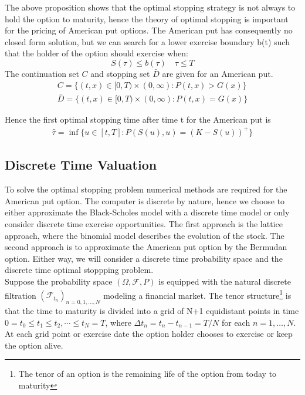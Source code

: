 The above proposition shows that the optimal stopping strategy is not always to hold the option to maturity, hence the theory of optimal stopping is important for the pricing of American put options. The American put has consequently no closed form solution, but we can search for a lower exercise boundary b(t) such that the holder of the option should exercise when:
$$S(\tau)\leq b(\tau) \quad \tau \leq T$$
The continuation set $C$ and stopping set $\bar{D}$ are given for an American put.
\begin{align*}
C=\{(t,x) \in [0,T) \times (0,\infty) : P(t,x) > G(x) \}\\
\bar{D}=\{(t,x) \in [0,T) \times (0,\infty) : P(t,x) = G(x) \}
\end{align*} 

Hence the first optimal stopping time after time t for the American put is
\begin{equation*}
\begin{split}
\hat{\tau}= \inf\{u \in [t,T] : P(S(u),u) = (K-S(u))^+ \}
\end{split}
\end{equation*}

\subsection{Discrete Time Valuation}\label{DiscreteValueFramework}
To solve the optimal stopping problem numerical methods are required for the American put option. The computer is discrete by nature, hence we choose to either approximate the Black-Scholes model with a discrete time model or only consider discrete time exercise opportunities. The first approach is the lattice approach, where the binomial model describes the evolution of the stock. The second approach is to approximate the American put option by the Bermudan option. Either way, we will consider a discrete time probability space and the discrete time optimal stoppping problem.\\

Suppose the probability space $(\Omega, \mathcal{F}, P)$ is equipped with the natural discrete filtration $(\mathcal{F}_{t_n})_{n=0,1,\ldots,N}$ modeling a financial market. The tenor structure\footnote{The tenor of an option is the remaining life of the option from today to maturity} is that the time to maturity is divided into a grid of N+1 equidistant points in time $0=t_0\leq t_1\leq t_2, \cdots \leq t_N=T$, where $\Delta t_n = t_n-t_{n-1}=T/N$ for each $n=1, \ldots, N$. At each grid point or exercise date the option holder chooses to exercise or keep the option alive. \\

